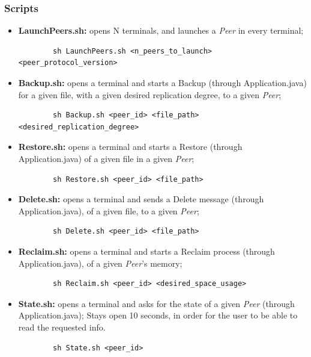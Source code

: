 \documentclass[a4paper]{article}
\begin{document}
\subsubsection{Scripts}
\begin{itemize}
    \item \textbf{LaunchPeers.sh:} opens N terminals, and launches a \textit{Peer} in every
    terminal;
    \begin{lstlisting}
        sh LaunchPeers.sh <n_peers_to_launch> <peer_protocol_version>
    \end{lstlisting}
    \item \textbf{Backup.sh:} opens a terminal and starts a Backup (through Application.java) for
    a given file, with a given desired replication degree, to a given \textit{Peer};
    \begin{lstlisting}
        sh Backup.sh <peer_id> <file_path> <desired_replication_degree>
    \end{lstlisting}
    \item \textbf{Restore.sh:} opens a terminal and starts a Restore (through Application.java)
    of a given file in a given \textit{Peer};
    \begin{lstlisting}
        sh Restore.sh <peer_id> <file_path>
    \end{lstlisting}
    \item \textbf{Delete.sh:} opens a terminal and sends a Delete message (through
    Application.java), of a given file, to a given \textit{Peer};
    \begin{lstlisting}
        sh Delete.sh <peer_id> <file_path>
    \end{lstlisting}
    \item \textbf{Reclaim.sh:} opens a terminal and starts a Reclaim process (through 
    Application.java), of a given \textit{Peer}'s memory;
    \begin{lstlisting}
        sh Reclaim.sh <peer_id> <desired_space_usage>
    \end{lstlisting}
    \item \textbf{State.sh:} opens a terminal and asks for the state of a given \textit{Peer} 
    (through Application.java); Stays open 10 seconds, in order for the user to be able to read 
    the requested info.
    \begin{lstlisting}
        sh State.sh <peer_id>
    \end{lstlisting}
\end{itemize}

\newpage
\end{document}
